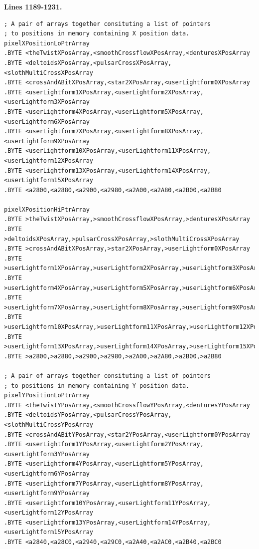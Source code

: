 


\clearpage
\textbf{Lines 1189-1231. } 
\begin{lstlisting}[basicstyle=\ttfamily\scriptsize,caption = All the pattern data structures in Colourspace organized into a set of arrays. 
We use these arrays to choose the correct user-selected pattern at painting time.]
; A pair of arrays together consituting a list of pointers
; to positions in memory containing X position data.
pixelXPositionLoPtrArray   
.BYTE <theTwistXPosArray,<smoothCrossflowXPosArray,<denturesXPosArray
.BYTE <deltoidsXPosArray,<pulsarCrossXPosArray,<slothMultiCrossXPosArray
.BYTE <crossAndABitXPosArray,<star2XPosArray,<userLightform0XPosArray
.BYTE <userLightform1XPosArray,<userLightform2XPosArray,<userLightform3XPosArray
.BYTE <userLightform4XPosArray,<userLightform5XPosArray,<userLightform6XPosArray
.BYTE <userLightform7XPosArray,<userLightform8XPosArray,<userLightform9XPosArray
.BYTE <userLightform10XPosArray,<userLightform11XPosArray,<userLightform12XPosArray
.BYTE <userLightform13XPosArray,<userLightform14XPosArray,<userLightform15XPosArray
.BYTE <a2800,<a2880,<a2900,<a2980,<a2A00,<a2A80,<a2B00,<a2B80

pixelXPositionHiPtrArray   
.BYTE >theTwistXPosArray,>smoothCrossflowXPosArray,>denturesXPosArray
.BYTE >deltoidsXPosArray,>pulsarCrossXPosArray,>slothMultiCrossXPosArray
.BYTE >crossAndABitXPosArray,>star2XPosArray,>userLightform0XPosArray
.BYTE >userLightform1XPosArray,>userLightform2XPosArray,>userLightform3XPosArray
.BYTE >userLightform4XPosArray,>userLightform5XPosArray,>userLightform6XPosArray
.BYTE >userLightform7XPosArray,>userLightform8XPosArray,>userLightform9XPosArray
.BYTE >userLightform10XPosArray,>userLightform11XPosArray,>userLightform12XPosArray
.BYTE >userLightform13XPosArray,>userLightform14XPosArray,>userLightform15XPosArray
.BYTE >a2800,>a2880,>a2900,>a2980,>a2A00,>a2A80,>a2B00,>a2B80

; A pair of arrays together consituting a list of pointers
; to positions in memory containing Y position data.
pixelYPositionLoPtrArray   
.BYTE <theTwistYPosArray,<smoothCrossflowYPosArray,<denturesYPosArray
.BYTE <deltoidsYPosArray,<pulsarCrossYPosArray,<slothMultiCrossYPosArray
.BYTE <crossAndABitYPosArray,<star2YPosArray,<userLightform0YPosArray
.BYTE <userLightform1YPosArray,<userLightform2YPosArray,<userLightform3YPosArray
.BYTE <userLightform4YPosArray,<userLightform5YPosArray,<userLightform6YPosArray
.BYTE <userLightform7YPosArray,<userLightform8YPosArray,<userLightform9YPosArray
.BYTE <userLightform10YPosArray,<userLightform11YPosArray,<userLightform12YPosArray
.BYTE <userLightform13YPosArray,<userLightform14YPosArray,<userLightform15YPosArray
.BYTE <a2840,<a28C0,<a2940,<a29C0,<a2A40,<a2AC0,<a2B40,<a2BC0


\end{lstlisting}
